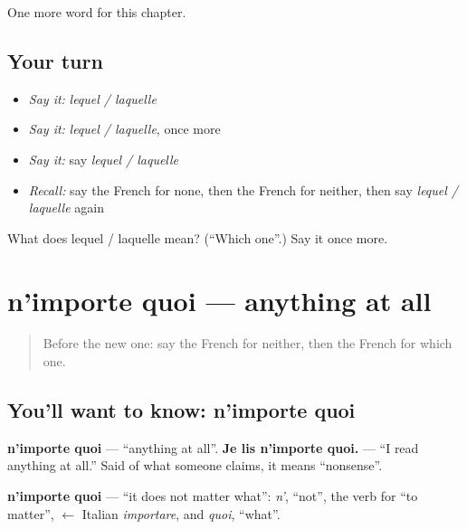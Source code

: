 \begin{grammarlens}[title={What you've built}]
One more word for this chapter.
\end{grammarlens}

\subsection*{Your turn}
\begin{itemize}
\raggedright
  \item \emph{Say it:} \emph{lequel / laquelle}
  \item \emph{Say it:} \emph{lequel / laquelle}, once more
  \item \emph{Say it:} say \emph{lequel / laquelle}
  \item \emph{Recall:} say the French for none, then the French for neither, then say \emph{lequel / laquelle} again
\end{itemize}

\begin{tcolorbox}[breakable,colback=teal!4,colframe=teal!35!black,title={Before you move on}]
What does lequel / laquelle mean? (\textquotedblleft{}Which one\textquotedblright{}.) Say it once more.
\end{tcolorbox}
\section[n'importe quoi]{n'importe quoi — anything at all}

\label{lesson:FR-C139-nimporte-quoi}



\begin{quote}
Before the new one: say the French for neither, then the French for which one.
\end{quote}

\subsection*{You'll want to know: n'importe quoi}
\textbf{n'importe quoi} — \textquotedblleft{}anything at all\textquotedblright{}. \textbf{Je lis n'importe quoi.} — \textquotedblleft{}I read anything at all.\textquotedblright{} Said of what someone claims, it means \textquotedblleft{}nonsense\textquotedblright{}.

\begin{cousinweb}
\textbf{n'importe quoi} — \textquotedblleft{}it does not matter what\textquotedblright{}: \emph{n'}, \textquotedblleft{}not\textquotedblright{}, the verb for \textquotedblleft{}to matter\textquotedblright{}, $\leftarrow$ Italian \emph{importare}, and \emph{quoi}, \textquotedblleft{}what\textquotedblright{}.
\end{cousinweb}

